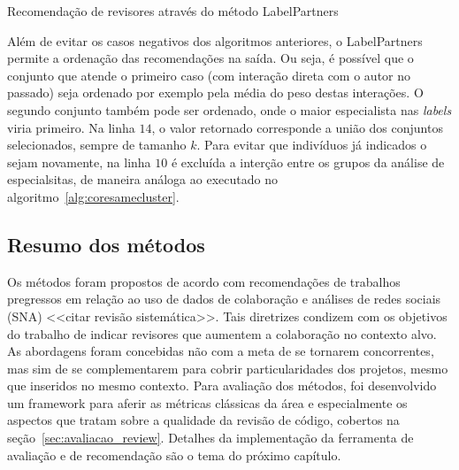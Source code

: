 \documentclass[12pt,openany,oneside,a4paper,english,brazil]{abntbibufjf}
\begin{document}
  \begin{algorithm}
  \label{alg:labelpartners}
   \caption{Recomendação de revisores através do método LabelPartners}

  \end{algorithm}

Além de evitar os casos negativos dos algoritmos anteriores, o LabelPartners permite a ordenação das recomendações na saída. Ou seja, é possível que o conjunto que atende o primeiro caso (com interação direta com o autor no passado) seja ordenado por exemplo pela média do peso destas interações. O segundo conjunto também pode ser ordenado, onde o maior especialista nas \textit{labels} viria primeiro. Na linha $14$, o valor retornado corresponde a união dos conjuntos selecionados, sempre de tamanho $k$. Para evitar que indivíduos já indicados o sejam novamente, na linha $10$ é excluída a interção entre os grupos da análise de especialsitas, de maneira análoga ao executado no algoritmo~\ref{alg:coresamecluster}.

\subsection{Resumo dos métodos}
Os métodos foram propostos de acordo com recomendações de trabalhos pregressos em relação ao uso de dados de colaboração e análises de redes sociais (SNA) \cite{fu2017, xia2017} <<citar revisão sistemática>>. Tais diretrizes condizem com os objetivos do trabalho de indicar revisores que aumentem a colaboração no contexto alvo. As abordagens foram concebidas não com a meta de se tornarem concorrentes, mas sim de se complementarem para cobrir particularidades dos projetos, mesmo que inseridos no mesmo contexto. Para avaliação dos métodos, foi desenvolvido um framework para aferir as métricas clássicas da área e especialmente os aspectos que tratam sobre a qualidade da revisão de código, cobertos na seção~\ref{sec:avaliacao_review}. Detalhes da implementação da ferramenta de avaliação e de recomendação são o tema do próximo capítulo.
\end{document}
